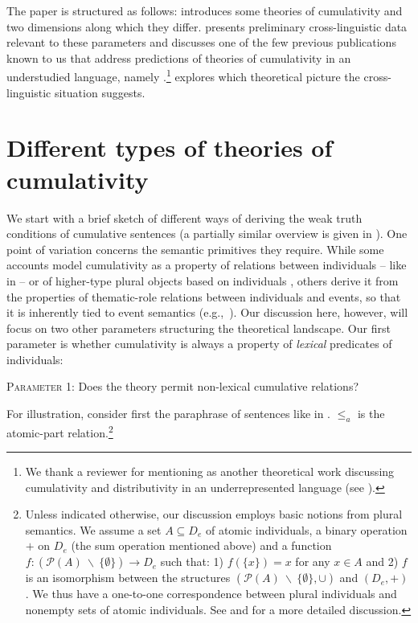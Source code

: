 \documentclass[output=paper]{langscibook}
\begin{document}
The paper is structured as follows:  introduces some theories of cumulativity and two dimensions along which they differ.  presents preliminary cross-linguistic data relevant to these parameters and discusses one of the few previous publications known to us that address predictions of theories of cumulativity in an understudied language, namely \citet{Beck:2012}.\footnote{We thank a reviewer for mentioning \citet{Henderson:2012} as another theoretical work discussing cumulativity and distributivity in an underrepresented language (see ).}  explores which theoretical picture the cross-linguistic situation suggests.

\section{Different types of theories of cumulativity}\label{has-sch:sec:2}


We start with a brief sketch of different ways of deriving the weak truth conditions of cumulative sentences (a partially similar overview is given in \citealt{Champollion:2015b}). One point of variation concerns the semantic primitives they require. While some accounts \citep{Scha:1981,Krifka:1986,Beck:2000a,Champollion:2010a} model cumulativity as a property of relations between individuals -- like  in  -- or of higher-type plural objects based on individuals \citep{Schmitt:2019}, others derive it from the properties of thematic-role relations between individuals and events, so that it is inherently tied to event semantics (e.g.,~\citealt{Schein:1993, Landman:2000, Kratzer:2003, Ferreira:2005, Zweig:2008, Zweig:2009}). Our discussion here, however, will focus on two other parameters structuring the theoretical landscape. Our first parameter is whether cumulativity is always a property of \textit{lexical}  predicates of individuals:

\ea\label{has-sch:par1} \textsc{Parameter 1:} Does the theory permit non-lexical cumulative relations?\z

\noindent For illustration, consider first the paraphrase of sentences like  in . 
 $\leq_a$ is the atomic-part relation.\footnote{Unless indicated otherwise, our discussion employs basic notions from plural semantics.  We assume a set $A \subseteq D_e$ of atomic individuals, a binary operation $+$ on $D_e$  (the sum operation mentioned above) and a function $f: (\mathcal{P}(A)\ \backslash\ \{\emptyset\}) \to D_e$ such that: 1) $f(\{x\}) = x$ for any $x \in A$ and 2) $f$ is an isomorphism between the structures $(\mathcal{P}(A)\ \backslash\ \{\emptyset\}, \cup)$ and $(D_e, +)$. We thus have a one-to-one correspondence between plural individuals and nonempty sets of atomic individuals. See \citet{Link:1983} and \citet{Champollion:2016} for a more detailed discussion.} 
 
\end{document}
